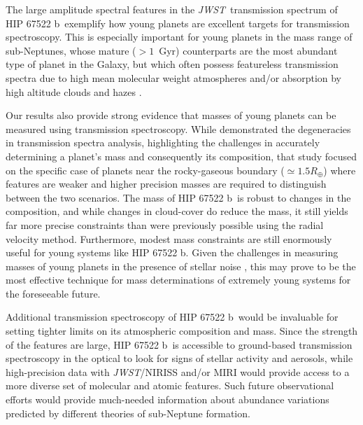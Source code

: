 \documentclass[twocolumn]{aastex63} %
\newcommand{\jwst}{\textit{JWST}}
\newcommand{\plname}{HIP 67522 b}
\begin{document}
The large amplitude spectral features in the \jwst\, transmission spectrum of \plname\
exemplify how young planets are excellent targets for transmission spectroscopy. This is especially important for young planets in the mass range of sub-Neptunes, whose mature ($> 1$~Gyr) counterparts are the most abundant type of planet in the Galaxy, but which often possess featureless transmission spectra due to high mean molecular weight atmospheres and/or absorption by high altitude clouds and hazes \citep{knutson14, kreidberg14, guo20, libbyroberts20, mikalevans21, brande22, kreidberg22, mikalevans23, roy23, brande24}. 



Our results also provide strong evidence that masses of young planets can be measured using transmission spectroscopy. While \citet{batalha2017challenges} demonstrated the degeneracies in transmission spectra analysis, highlighting the challenges in accurately determining a planet's mass and consequently its composition, that study focused on the specific case of planets near the rocky-gaseous boundary ($\simeq1.5R_\oplus$) where features are weaker and higher precision masses are required to distinguish between the two scenarios. The mass of \plname\ is robust to changes in the composition, and while changes in cloud-cover do reduce the mass, it still yields far more precise constraints than were previously possible using the radial velocity method. Furthermore, modest mass constraints are still enormously useful for young systems like \plname. Given the challenges in measuring masses of young planets in the presence of stellar noise \citep[e.g.][]{blunt2023overfitting}, this may prove to be the most effective technique for mass determinations of extremely young systems for the foreseeable future. 

Additional transmission spectroscopy of \plname\ would be invaluable for setting tighter limits on its atmospheric composition and mass. Since the strength of the features are large, \plname\ is accessible to ground-based transmission spectroscopy in the optical to look for signs of stellar activity and aerosols, while high-precision data with \jwst/NIRISS and/or MIRI would provide access to a more diverse set of molecular and atomic features. Such future observational efforts would provide much-needed information about abundance variations predicted by different theories of sub-Neptune formation. 
\end{document}
